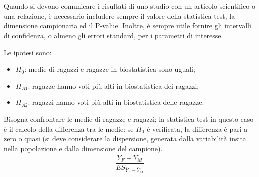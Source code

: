 \documentclass[10pt, draft]{book}
\newcounter{example}[section]
\begin{document}
\\
\\
Quando si devono comunicare i risultati di uno studio con un articolo scientifico o una relazione, è necessario includere sempre il valore della statistica test, la dimensione campionaria ed il P-value. Inoltre, è sempre utile fornire gli intervalli di confidenza, o almeno gli errori standard, per i parametri di interesse.
\begin{example}\label{esvoti}
    Le ipotesi sono:
    \begin{itemize}
        \item $H_0$: medie di ragazzi e ragazze in biostatistica sono uguali;
        \item $H_{A1}$: ragazze hanno voti più alti in biostatistica dei ragazzi;
        \item $H_{A2}$: ragazzi hanno voti più alti in biostatistica delle ragazze.
    \end{itemize}
    Bisogna confrontare le medie di ragazze e ragazzi; la statistica test in questo caso è il calcolo della differenza tra le medie: se $H_0$ è verificata, la differenza è pari a zero o quasi (si deve considerare la dispersione, generata dalla variabilità insita nella popolazione e dalla dimensione del campione).
    \begin{equation}
        \frac{\overline{Y}_F-\overline{Y}_M}{ES_{\overline{Y}_F-\overline{Y}_M}}
    \end{equation}
\end{example}
\end{document}
